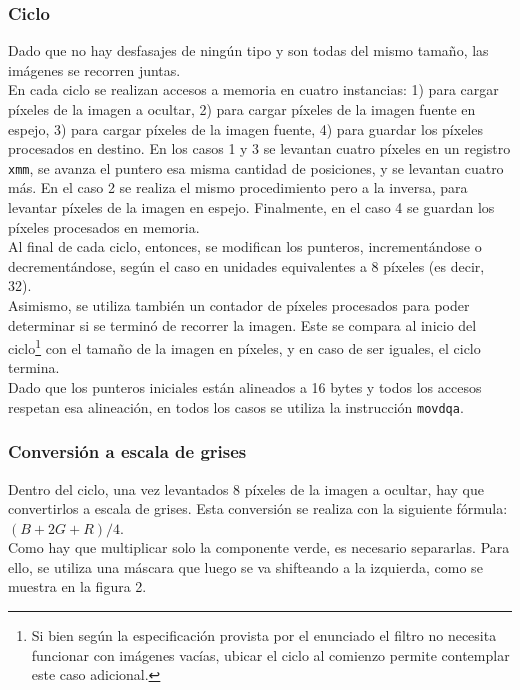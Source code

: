 \documentclass[a4paper]{article}
\begin{document}
\subsubsection{Ciclo}
Dado que no hay desfasajes de ningún tipo y son todas del mismo tamaño, las imágenes se recorren juntas. \\
En cada ciclo se realizan accesos a memoria en cuatro instancias: 1) para cargar píxeles de la imagen a ocultar, 2) para cargar píxeles de la imagen fuente en espejo, 3) para cargar píxeles de la imagen fuente, 4) para guardar los píxeles procesados en destino. En los casos 1 y 3 se levantan cuatro píxeles en un registro {\tt xmm}, se avanza el puntero esa misma cantidad de posiciones, y se levantan cuatro más. En el caso 2 se realiza el mismo procedimiento pero a la inversa, para levantar píxeles de la imagen en espejo. Finalmente, en el caso 4 se guardan los píxeles procesados en memoria. \\
Al final de cada ciclo, entonces, se modifican los punteros, incrementándose o decrementándose, según el caso en unidades equivalentes a 8 píxeles (es decir, 32). \\
Asimismo, se utiliza también un contador de píxeles procesados para poder determinar si se terminó de recorrer la imagen. Este se compara al inicio del ciclo\footnote{Si bien según la especificación provista por el enunciado el filtro no necesita funcionar con imágenes vacías, ubicar el ciclo al comienzo permite contemplar este caso adicional.} con el tamaño de la imagen en píxeles, y en caso de ser iguales, el ciclo termina. \\
Dado que los punteros iniciales están alineados a 16 bytes y todos los accesos respetan esa alineación, en todos los casos se utiliza la instrucción {\tt movdqa}.

\subsubsection{Conversión a escala de grises}
Dentro del ciclo, una vez levantados 8 píxeles de la imagen a ocultar, hay que convertirlos a escala de grises. Esta conversión se realiza con la siguiente fórmula: $(B + 2G + R)/4$. \\
Como hay que multiplicar solo la componente verde, es necesario separarlas. Para ello, se utiliza una máscara que luego se va shifteando a la izquierda, como se muestra en la figura 2.
\end{document}
